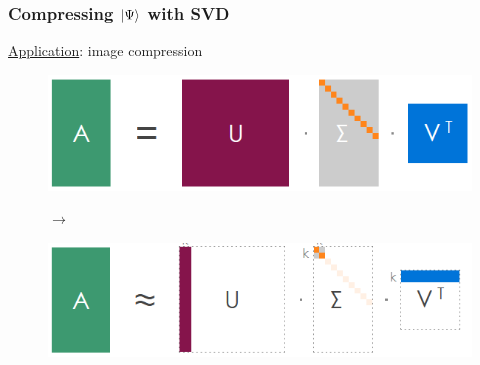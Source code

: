 \documentclass{beamer}
\theoremstyle{definition}
\begin{document}
\begin{frame}
	\frametitle{Compressing $\ket{\Psi}$ with SVD}
	
	\underline{Application}: image compression
	
	\begin{figure}[!htb]
		\centering
		\begin{minipage}{0.45\textwidth}
			\centering
			\includegraphics[scale=0.34]{svd1.png}
		\end{minipage}
	$\to$
		\begin{minipage}{0.45\textwidth}
			\centering
			\includegraphics[scale=0.34]{svd2.png}
		\end{minipage}
	\end{figure}


\end{frame}
\end{document}
